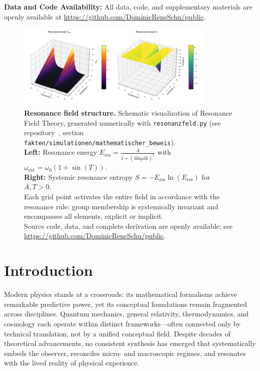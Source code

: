 \documentclass[12pt]{iopart}
\begin{document}
	\medskip
	
	\noindent\textbf{Data and Code Availability:} All data, code, and supplementary materials are openly available at \url{https://github.com/DominicReneSchu/public}.
	
	\begin{figure}[ht]
		\centering
		\includegraphics[width=0.85\textwidth]{figures/plot.png}
		\caption{
			\textbf{Resonance field structure.}
			Schematic visualization of Resonance Field Theory, generated numerically with \texttt{resonanzfeld.py} (see repository~\cite{rftrepo}, section \texttt{fakten/simulationen/mathematischer\_beweis}).\\
			\textbf{Left:} Resonance energy $E_{\mathrm{res}} = \frac{A}{1 + \left(\frac{\omega_\mathrm{ext} - \omega_0}{\gamma}\right)^2}$ with $\omega_\mathrm{ext} = \omega_0 (1 + \sin(T))$.\\
			\textbf{Right:} Systemic resonance entropy $S = -E_{\mathrm{res}}\ln(E_{\mathrm{res}})$ for $A, T > 0$.\\
			Each grid point activates the entire field in accordance with the resonance rule: group membership is systemically invariant and encompasses all elements, explicit or implicit.\\
			Source code, data, and complete derivation are openly available; see \url{https://github.com/DominicReneSchu/public}.
		}
		\label{fig:resonance_field_plot}
	\end{figure}
	
	\section{Introduction}
	
	Modern physics stands at a crossroads: its mathematical formalisms achieve remarkable predictive power, yet its conceptual foundations remain fragmented across disciplines. Quantum mechanics, general relativity, thermodynamics, and cosmology each operate within distinct frameworks—often connected only by technical translation, not by a unified conceptual field. Despite decades of theoretical advancements, no consistent synthesis has emerged that systematically embeds the observer, reconciles micro- and macroscopic regimes, and resonates with the lived reality of physical experience.
	
\end{document}
